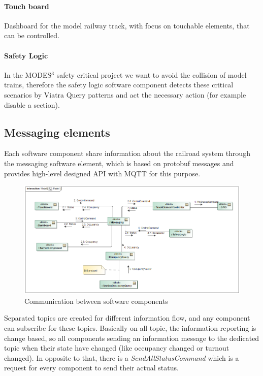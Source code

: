 \paragraph{Touch board}
Dashboard for the model railway track, with focus on touchable elements, that can be controlled.
\paragraph{Safety Logic}
In the MODES$^3$ safety critical project we want to avoid the collision of model trains, therefore the safety logic software component detects these critical scenarios by Viatra Query \cite{Viatra} patterns and act the necessary action (for example disable a section).

\subsection{Messaging elements}
Each software component share information about the railroad system through the messaging software element, which is based on protobuf messages and provides high-level designed API with MQTT for this purpose. 
\begin{figure}[!h]
	\centering
	\includegraphics[width=150mm, keepaspectratio]{figures/modes3/CommunicationModel.png}
	\caption{Communication between software components}
	\label{fig:communicationModel}
\end{figure}

Separated topics are created for different information flow, and any component can subscribe for these topics. Basically on all topic, the information reporting is change based, so all components sending an information message to the dedicated topic when their state have changed (like occupancy changed or turnout changed). In opposite to that, there is a \textit{SendAllStatusCommand} which is a request for every component to send their actual status.

